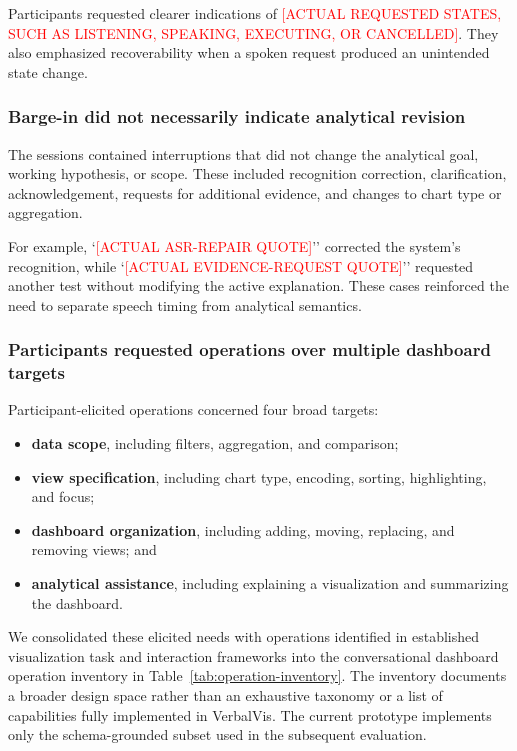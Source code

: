 \documentclass[journal]{IEEEtran}
\begin{document}
Participants requested clearer indications of
\textcolor{red}{[ACTUAL REQUESTED STATES, SUCH AS LISTENING, SPEAKING,
EXECUTING, OR CANCELLED]}. They also emphasized recoverability when a spoken
request produced an unintended state change.

\subsubsection{Barge-in did not necessarily indicate analytical revision}

The sessions contained interruptions that did not change the analytical goal,
working hypothesis, or scope. These included recognition correction,
clarification, acknowledgement, requests for additional evidence, and changes
to chart type or aggregation.

For example, `\textcolor{red}{[ACTUAL ASR-REPAIR QUOTE]}'' corrected the
system's recognition, while `\textcolor{red}{[ACTUAL EVIDENCE-REQUEST
QUOTE]}'' requested another test without modifying the active explanation.
These cases reinforced the need to separate speech timing from analytical
semantics.

\subsubsection{Participants requested operations over multiple dashboard targets}

Participant-elicited operations concerned four broad targets:

\begin{itemize}
\item \textbf{data scope}, including filters, aggregation, and comparison;
\item \textbf{view specification}, including chart type, encoding, sorting,
highlighting, and focus;
\item \textbf{dashboard organization}, including adding, moving,
replacing, and removing views; and
\item \textbf{analytical assistance}, including explaining a visualization
and summarizing the dashboard.
\end{itemize}

We consolidated these elicited needs with operations identified in established
visualization task and interaction frameworks
\cite{brehmer2013multilevel,yi2007toward} into the conversational dashboard
operation inventory in Table~\ref{tab:operation-inventory}. The inventory
documents a broader design space rather than an exhaustive taxonomy or a list
of capabilities fully implemented in VerbalVis. The current prototype
implements only the schema-grounded subset used in the subsequent evaluation.
\end{document}
